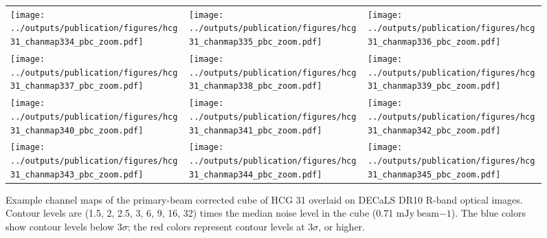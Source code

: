 \documentclass{aa}
\begin{document}
\begin{figure*}
    \setlength{\tabcolsep}{0pt}
    \begin{tabular}{l l l}
        \texttt{[image: ../outputs/publication/figures/hcg31\_chanmap334\_pbc\_zoom.pdf]} &
        \texttt{[image: ../outputs/publication/figures/hcg31\_chanmap335\_pbc\_zoom.pdf]} &
        \texttt{[image: ../outputs/publication/figures/hcg31\_chanmap336\_pbc\_zoom.pdf]} \\[-0.2cm]
        \texttt{[image: ../outputs/publication/figures/hcg31\_chanmap337\_pbc\_zoom.pdf]} &
        \texttt{[image: ../outputs/publication/figures/hcg31\_chanmap338\_pbc\_zoom.pdf]} &
        \texttt{[image: ../outputs/publication/figures/hcg31\_chanmap339\_pbc\_zoom.pdf]} \\[-0.2cm]
        \texttt{[image: ../outputs/publication/figures/hcg31\_chanmap340\_pbc\_zoom.pdf]} &
        \texttt{[image: ../outputs/publication/figures/hcg31\_chanmap341\_pbc\_zoom.pdf]} & 
        \texttt{[image: ../outputs/publication/figures/hcg31\_chanmap342\_pbc\_zoom.pdf]} \\[-0.2cm] 
        \texttt{[image: ../outputs/publication/figures/hcg31\_chanmap343\_pbc\_zoom.pdf]} & 
        \texttt{[image: ../outputs/publication/figures/hcg31\_chanmap344\_pbc\_zoom.pdf]} & 
        \texttt{[image: ../outputs/publication/figures/hcg31\_chanmap345\_pbc\_zoom.pdf]}  
      \end{tabular}
      \caption{Example channel maps of the primary-beam corrected cube of HCG 31 overlaid on DECaLS DR10 R-band optical images. Contour levels are (1.5, 2, 2.5, 3, 6, 9, 16, 32) 
      times the median noise level in the cube (0.71 $\mathrm{mJy~beam{-1}}$). The blue colors show contour levels below 3$\sigma$; the red colors represent contour levels at 3$\sigma$, or higher.}
      \label{fig:hcg31_chanmap}
     \end{figure*}
\end{document}
